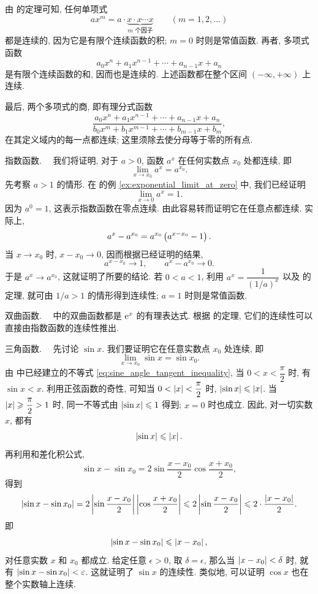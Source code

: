 由  的定理可知, 任何单项式
$$
ax^m=a\cdot\underbrace{x\cdot x\cdots x}_{m\text{ 个因子}}
\qquad(m=1,2,\ldots)
$$
都是连续的, 因为它是有限个连续函数的积; $m=0$ 时则是常值函数.
再者, 多项式函数
$$
a_0x^n+a_1x^{n-1}+\cdots+a_{n-1}x+a_n
$$
是有限个连续函数的和, 因而也是连续的.
上述函数都在整个区间 $(-\infty,+\infty)$ 上连续.

最后, 两个多项式的商, 即有理分式函数
$$
\frac{a_0x^n+a_1x^{n-1}+\cdots+a_{n-1}x+a_n}
{b_0x^m+b_1x^{m-1}+\cdots+b_{m-1}x+b_m},
$$
在其定义域内的每一点都连续; 这里须除去使分母等于零的所有点.

\myrefparagraph{2\textdegree}\label{ex:exponential_continuity}
指数函数.~~
我们将证明, 对于 $a>0$, 函数 $a^x$ 在任何实数点 $x_0$ 处都连续, 即
$$
\lim_{x\to x_0}a^x=a^{x_0}.
$$
先考察 $a>1$ 的情形. 在  的例 \ref{ex:exponential_limit_at_zero} 中,
我们已经证明
$$
\lim_{x\to0}a^x=1.
$$
因为 $a^0=1$, 这表示指数函数在零点连续.
由此容易转而证明它在任意点都连续. 实际上,
$$
a^x-a^{x_0}=a^{x_0}\left( a^{x-x_0}-1 \right).
$$
当 $x\to x_0$ 时, $x-x_0\to0$, 因而根据已经证明的结果,
$$
a^{x-x_0}\to1,\qquad a^x-a^{x_0}\to0.
$$
于是 $a^x\to a^{x_0}$, 这就证明了所要的结论.
若 $0<a<1$, 利用 $a^x=\dfrac1{(1/a)^x}$ 以及  的定理,
就可由 $1/a>1$ 的情形得到连续性; $a=1$ 时则是常值函数.

\myrefparagraph{3\textdegree}\label{ex:hyperbolic_continuity}
双曲函数.~~
 中的双曲函数都是 $\mathrm{e}^x$ 的有理表达式.
根据  的定理, 它们的连续性可以直接由指数函数的连续性推出.

\myrefparagraph{4\textdegree}\label{ex:trigonometric_continuity}
三角函数.~~
先讨论 $\sin x$. 我们要证明它在任意实数点 $x_0$ 处连续, 即
$$
\lim_{x\to x_0}\sin x=\sin x_0.
$$
由  中已经建立的不等式 \eqref{eq:sine_angle_tangent_inequality},
当 $0<x<\dfrac\pi2$ 时, 有 $\sin x<x$.
利用正弦函数的奇性, 可知当 $0<\left| x \right|<\dfrac\pi2$ 时,
$\left| \sin x \right|\leqslant\left| x \right|$.
当 $\left| x \right|\geqslant\dfrac\pi2>1$ 时, 同一不等式由 $\left| \sin x \right|\leqslant1$ 得到;
$x=0$ 时也成立. 因此, 对一切实数 $x$, 都有
$$
\left| \sin x \right|\leqslant\left| x \right|.
$$
再利用和差化积公式,
$$
\sin x-\sin x_0=2\sin\frac{x-x_0}{2}\cos\frac{x+x_0}{2},
$$
得到
$$
\left| \sin x-\sin x_0 \right|
=2\left| \sin\frac{x-x_0}{2} \right|\left| \cos\frac{x+x_0}{2} \right|
\leqslant2\left| \sin\frac{x-x_0}{2} \right|
\leqslant2\cdot\frac{\left| x-x_0 \right|}2.
$$
即
\begin{equation}\label{eq:sine_difference_bound}
\left| \sin x-\sin x_0 \right|\leqslant\left| x-x_0 \right|,
\end{equation}
对任意实数 $x$ 和 $x_0$ 都成立.
给定任意 $\epsilon>0$, 取 $\delta=\epsilon$, 那么当 $\left| x-x_0 \right|<\delta$ 时,
就有 $\left| \sin x-\sin x_0 \right|<\varepsilon$.
这就证明了 $\sin x$ 的连续性.
类似地, 可以证明 $\cos x$ 也在整个实数轴上连续.

